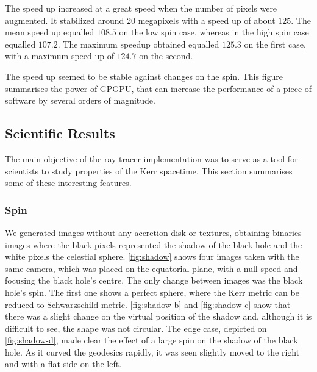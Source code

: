The speed up increased at a great speed when the number of pixels were augmented. It stabilized around 20 megapixels with a speed up of about $125$. The mean speed up equalled $108.5$ on the low spin case, whereas in the high spin case equalled $107.2$. The maximum speedup obtained equalled $125.3$ on the first case, with a maximum speed up of $124.7$ on the second.

The speed up seemed to be stable against changes on the spin. This figure summarises the power of \ac{GPGPU}, that can increase the performance of a piece of software by several orders of magnitude.


\subsection{Scientific Results}

The main objective of the ray tracer implementation was to serve as a tool for scientists to study properties of the Kerr spacetime. This section summarises some of these interesting features.

\subsubsection*{Spin}

We generated images without any accretion disk or textures, obtaining binaries images where the black pixels represented the shadow of the black hole and the white pixels the celestial sphere. \autoref{fig:shadow} shows four images taken with the same camera, which was placed on the equatorial plane, with a null speed and focusing the black hole's centre. The only change between images was the black hole's spin. The first one shows a perfect sphere, where the Kerr metric can be reduced to Schwarzschild metric. \autoref{fig:shadow-b} and \autoref{fig:shadow-c} show that there was a slight change on the virtual position of the shadow and, although it is difficult to see, the shape was not circular. The edge case, depicted on \autoref{fig:shadow-d}, made clear the effect of a large spin on the shadow of the black hole. As it curved the geodesics rapidly, it was seen slightly moved to the right and with a flat side on the left.


